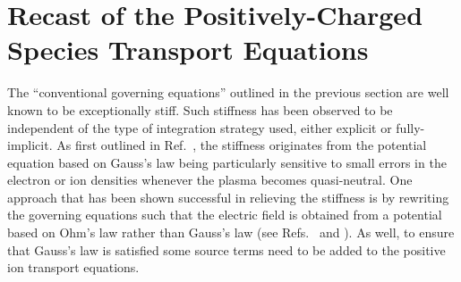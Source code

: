 \documentclass[twoside,onecolumn,10pt]{waflarticle}
\begin{document}
\section{Recast of the Positively-Charged Species Transport Equations}


The ``conventional governing equations'' outlined in the previous section are well known to be exceptionally stiff. Such stiffness has been observed to be independent of the type of integration strategy used, either explicit or fully-implicit. As first outlined in Ref.\ \cite{jcp:2013:parent}, the stiffness originates from the potential equation based on Gauss's law being particularly sensitive to small errors in the electron or ion densities whenever the plasma becomes quasi-neutral. One approach that has been shown successful in relieving the stiffness is by rewriting the governing equations such that the electric field is obtained from a potential based on Ohm's law rather than Gauss's law (see Refs.\ \cite{jcp:2013:parent} and \cite{jcp:2014:parent}). As well, to ensure that Gauss's law is satisfied some source terms need to be added to the positive ion transport equations. 
\end{document}
